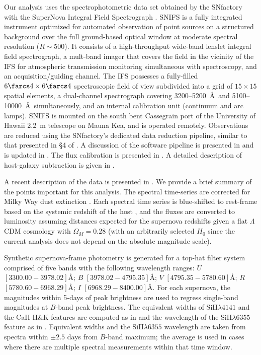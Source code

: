 \documentclass{aastex61}   	%
\begin{document}
Our analysis uses the spectrophotometric data set obtained by
the SNfactory with the SuperNova Integral Field
Spectrograph \citep[SNIFS,][]{2002SPIE.4836...61A, 2004SPIE.5249..146L}.  SNIFS is a fully integrated
instrument optimized for automated observation of point sources on a
structured background over the full ground-based optical window at
moderate spectral resolution ($R \sim 500$).  It consists of a
high-throughput wide-band lenslet integral field spectrograph, a mult-band
imager that covers the field in the vicinity of
the IFS for atmospheric transmission monitoring simultaneous with
spectroscopy, and an acquisition/guiding channel.  The IFS possesses a
fully-filled $6\farcs 4 \times 6\farcs 4$ spectroscopic field of view
subdivided into a grid of $15 \times 15$ spatial elements, a
dual-channel spectrograph covering 3200--5200~\AA\ and 5100--10000~\AA\
simultaneously, and an internal calibration unit (continuum and arc
lamps).  SNIFS is mounted on the south bent Cassegrain port of the
University of Hawaii 2.2~m telescope on Mauna Kea, and is operated
remotely.  Observations are reduced using the SNfactory's dedicated data
reduction pipeline, similar to that presented in \S4 of \citet{2001MNRAS.326...23B}.
A discussion of the software pipeline is presented in
\citet{2006ApJ...650..510A} and is updated in \citet{2010ApJ...713.1073S}. 
The flux calibration is presented in \citet{2013A&A...549A...8B}.
A detailed
description of host-galaxy subtraction is given in \citet{2011MNRAS.418..258B}.

A recent description of the data is presented in \citet{2015ApJ...815...58F}.
We provide a brief summary of the points important for this analysis.
The spectral time-series  are corrected for Milky Way dust
extinction \citep{1989ApJ...345..245C,1998ApJ...500..525S}.  
Each spectral time series is
blue-shifted to rest-frame
based on the systemic redshift of the host \citep[c.f.][]{2013ApJ...770..107C}, and the fluxes are converted to luminosity assuming
distances expected for the supernova redshifts given a flat
$\Lambda$CDM cosmology with $\Omega_M = 0.28$ (with an arbitrarily selected
$H_0$ since the current analysis does not depend on the absolute magnitude scale).

Synthetic supernova-frame photometry is generated for a top-hat filter system
comprised of five 
bands with the following wavelength ranges: $U$ $[3300.00 - 3978.02]$\AA;
$B$ $[3978.02-4795.35]$\AA;
$V$ $[4795.35-5780.60]$\AA;
$R$ $[5780.60-6968.29]$\AA;
$I$ $[6968.29-8400.00]$\AA.
For each supernova, the magnitudes within 5-days of peak brightness are used to regress single-band magnitudes
at $B$-band peak brightness.
The equivalent widths of SiII$\lambda 4141$ and the CaII H\&K features are computed as
in \citet{2008A&A...477..717B} and the 
wavelength of the SiII$\lambda 6355$ feature
as in \citet{chotard:thesis, 2017Chotard}.
Equivalent widths and the
SiII$\lambda 6355$ wavelength are taken from spectra  within $\pm 2.5$ days from $B$-band maximum;
the average is used  in cases where there are multiple spectral measurements within that time window.
\end{document}
